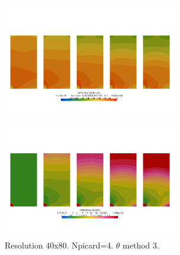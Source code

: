\begin{center}
\includegraphics[width=7.64cm]{python_codes/fieldstone_87/results/experiment_11/meth3/sr}
\includegraphics[width=7.64cm]{python_codes/fieldstone_87/results/experiment_11/meth3/eta}\\
{\captionfont Resolution 40x80. Npicard=4. $\theta$ method 3. }
\end{center}

